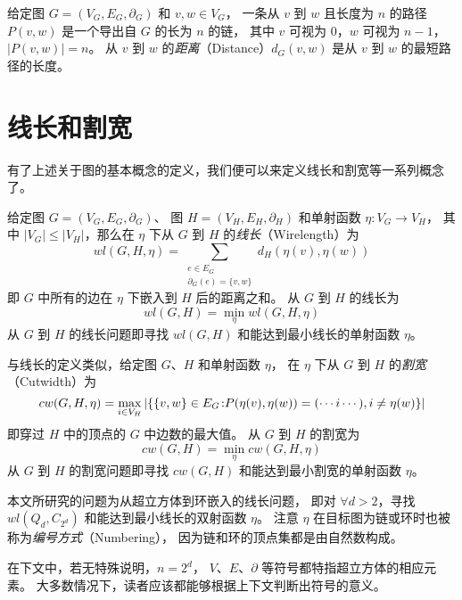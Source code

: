 给定图 $G = (V_G, E_G, \partial_G)$ 和 $v, w \in V_G$，
一条从 $v$ 到 $w$ 且长度为 $n$ 的路径 $P(v, w)$ 是一个导出自 $G$ 的长为 $n$ 的链，
其中 $v$ 可视为 $0$，$w$ 可视为 $n - 1$，$|P(v, w)| = n$。
从 $v$ 到 $w$ 的\emph{距离}（Distance）$d_G(v, w)$ 是从 $v$ 到 $w$ 的最短路径的长度。

\section{线长和割宽}
\label{Section 2.2}

有了上述关于图的基本概念的定义，我们便可以来定义线长和割宽等一系列概念了。

给定图 $G = (V_G, E_G, \partial_G)$、
图 $H = (V_H, E_H, \partial_H)$ 和单射函数 $\eta \colon V_G \rightarrow V_H$，
其中 $|V_G| \le |V_H|$，那么在 $\eta$ 下从 $G$ 到 $H$ 的\emph{线长}（Wirelength）为
\begin{equation*}
wl(G, H, \eta) = \sum_{\substack{
	e \in E_G \\
	\partial_G(e) = \{v, w\}
}} d_H(\eta(v), \eta(w))
\end{equation*}
即 $G$ 中所有的边在 $\eta$ 下嵌入到 $H$ 后的距离之和。
从 $G$ 到 $H$ 的线长为
\begin{equation*}
wl(G, H) = \min_{\eta} wl(G, H, \eta)
\end{equation*}
从 $G$ 到 $H$ 的线长问题即寻找 $wl(G, H)$ 和能达到最小线长的单射函数 $\eta$。

与线长的定义类似，给定图 $G$、$H$ 和单射函数 $\eta$，
在 $\eta$ 下从 $G$ 到 $H$ 的\emph{割宽}（Cutwidth）为
\begin{equation*}
cw(G, H, \eta) = \max_{i \in V_H} |\{\{v, w\} \in E_G \colon \\
P(\eta(v), \eta(w)) = (\cdots i \cdots), i \neq \eta(w)\}|
\end{equation*}
即穿过 $H$ 中的顶点的 $G$ 中边数的最大值。
从 $G$ 到 $H$ 的割宽为
\begin{equation*}
cw(G, H) = \min_{\eta} cw(G, H, \eta)
\end{equation*}
从 $G$ 到 $H$ 的割宽问题即寻找 $cw(G, H)$ 和能达到最小割宽的单射函数 $\eta$。

本文所研究的问题为从超立方体到环嵌入的线长问题，
即对 $\forall d > 2$，寻找 $wl(Q_d, C_{2^d})$ 和能达到最小线长的双射函数 $\eta$。
注意 $\eta$ 在目标图为链或环时也被称为\emph{编号方式}（Numbering），
因为链和环的顶点集都是由自然数构成。

在下文中，若无特殊说明，$n = 2^d$，
$V$、$E$、$\partial$ 等符号都特指超立方体的相应元素。
大多数情况下，读者应该都能够根据上下文判断出符号的意义。

